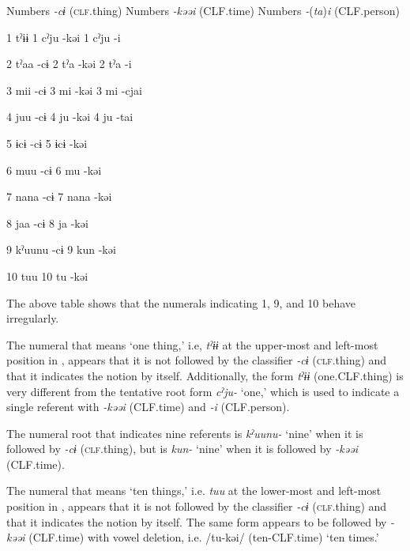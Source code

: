 Numbers  \textit{{}-cɨ} (\textsc{clf}.thing)    Numbers  \textit{{}-kəəi} (CLF.time)    Numbers  \textit{{}-}(\textit{ta})\textit{i} (CLF.person)

1  tˀɨɨ      1  cˀju  {}-kəi    1  cˀju  {}-i

2  tˀaa  {}-cɨ    2  tˀa  {}-kəi    2  tˀa  {}-i

3  mii  {}-cɨ    3  mi  {}-kəi    3  mi  {}-cjai

4  juu  {}-cɨ    4  ju  {}-kəi    4  ju  {}-tai

5  ɨcɨ  {}-cɨ    5  ɨcɨ  {}-kəi        

6  muu  {}-cɨ    6  mu  {}-kəi        

7  nana  {}-cɨ    7  nana  {}-kəi        

8  jaa  {}-cɨ    8  ja  {}-kəi        

9  kˀuunu  {}-cɨ    9  kun  {}-kəi        

10  tuu      10  tu  {}-kəi        

\begin{styleBeschriftung}
\textmd{The above table shows that the numerals indicating 1, 9, and 10 behave irregularly.}
\end{styleBeschriftung}

\begin{styleBeschriftung}
\textmd{The numeral that means ‘one thing,’ i.e,} \textmd{\textit{tˀɨɨ}}\textmd{ at the upper-most and left-most position in , appears that it is not followed by the classifier} \textmd{\textit{{}-cɨ}}\textmd{ (\textsc{clf}.thing) and} \textmd{that it indicates the notion by itself. Additionally, the form} \textmd{\textit{tˀɨɨ}}\textmd{ (one.CLF.thing) is very different from the tentative root form} \textmd{\textit{cˀju-}}\textmd{ ‘one,’ which is used to indicate a single referent with}\textmd{ \textit{-kəəi}}\textmd{ (CLF.time) and} \textmd{\textit{{}-i}}\textmd{ (CLF.person).}
\end{styleBeschriftung}

\begin{styleBeschriftung}
\textmd{The numeral root that indicates nine referents is} \textmd{\textit{kˀuunu-}}\textmd{ ‘nine’ when it is followed by} \textmd{\textit{{}-cɨ}}\textmd{ (\textsc{clf}.thing), but is} \textmd{\textit{kun-}}\textmd{ ‘nine’ when it is followed by} \textmd{\textit{{}-kəəi}}\textmd{ (CLF.time).}
\end{styleBeschriftung}

  The numeral that means ‘ten things,’ i.e. \textit{tuu} at the lower-most and left-most position in , appears that it is not followed by the classifier \textit{{}-cɨ} (\textsc{clf}.thing) and that it indicates the notion by itself. The same form appears to be followed by \textit{{}-kəəi} (CLF.time) with vowel deletion, i.e. /tu-kəi/ (ten-CLF.time) ‘ten times.’

